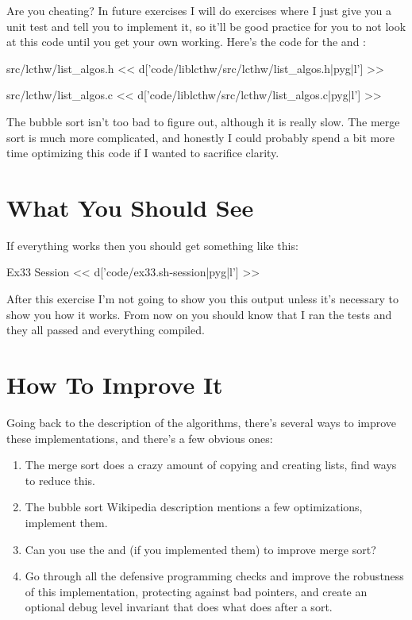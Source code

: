 Are you cheating?  In future exercises I will do exercises where I just give
you a unit test and tell you to implement it, so it'll be good practice for you
to not look at this code until you get your own working.  Here's the code for
the  and :

\begin{code}{src/lcthw/list\_algos.h}
<< d['code/liblcthw/src/lcthw/list_algos.h|pyg|l'] >>
\end{code}

\begin{code}{src/lcthw/list\_algos.c}
<< d['code/liblcthw/src/lcthw/list_algos.c|pyg|l'] >>
\end{code}

The bubble sort isn't too bad to figure out, although it is really slow.  The
merge sort is much more complicated, and honestly I could probably spend a bit
more time optimizing this code if I wanted to sacrifice clarity.

\section{What You Should See}

If everything works then you should get something like this:

\begin{code}{Ex33 Session}
<< d['code/ex33.sh-session|pyg|l'] >>
\end{code}

After this exercise I'm not going to show you this output unless it's necessary
to show you how it works.  From now on you should know that I ran the tests and
they all passed and everything compiled.

\section{How To Improve It}

Going back to the description of the algorithms, there's several ways to
improve these implementations, and there's a few obvious ones:

\begin{enumerate}
\item The merge sort does a crazy amount of copying and creating lists, find ways to reduce this.
\item The bubble sort Wikipedia description mentions a few optimizations, implement them.
\item Can you use the  and  (if you implemented them) to improve merge sort?
\item Go through all the defensive programming checks and improve the robustness of
    this implementation, protecting against bad  pointers, and create
    an optional debug level invariant that does what  does
    after a sort.
\end{enumerate}

